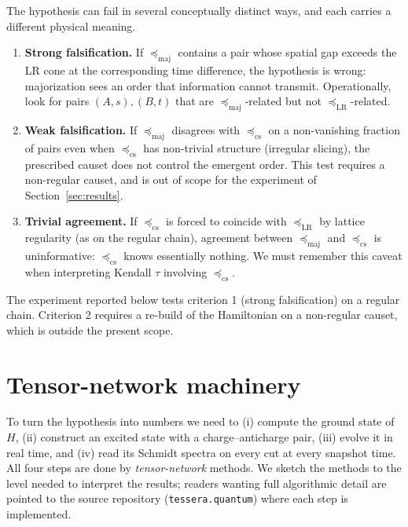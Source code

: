 \documentclass[11pt,a4paper]{article}
\theoremstyle{definition}
\theoremstyle{plain}
\theoremstyle{remark}
\newcommand{\maj}{\mathrm{maj}}
\newcommand{\LR}{\mathrm{LR}}
\newcommand{\cs}{\mathrm{cs}}
\begin{document}
The hypothesis can fail in several conceptually distinct ways, and
each carries a different physical meaning.

\begin{enumerate}[label=\arabic*.,leftmargin=*]
\item \textbf{Strong falsification.} If $\preceq_{\maj}$ contains a pair
      whose spatial gap exceeds the LR cone at the corresponding time
      difference, the hypothesis is wrong: majorization sees an order
      that information cannot transmit.  Operationally, look for pairs
      $(A, s), (B, t)$ that are $\preceq_{\maj}$-related but not
      $\preceq_{\LR}$-related.
\item \textbf{Weak falsification.} If $\preceq_{\maj}$ disagrees with
      $\preceq_{\cs}$ on a non-vanishing fraction of pairs even when
      $\preceq_{\cs}$ has non-trivial structure (irregular slicing),
      the prescribed causet does not control the emergent order.
      This test requires a non-regular causet, and is out of scope
      for the experiment of Section~\ref{sec:results}.
\item \textbf{Trivial agreement.} If $\preceq_{\cs}$ is forced to
      coincide with $\preceq_{\LR}$ by lattice regularity (as on the
      regular chain), agreement between $\preceq_{\maj}$ and
      $\preceq_{\cs}$ is uninformative: $\preceq_{\cs}$ knows
      essentially nothing.  We must remember this caveat when
      interpreting Kendall $\tau$ involving $\preceq_{\cs}$.
\end{enumerate}

The experiment reported below tests criterion 1 (strong falsification)
on a regular chain.  Criterion 2 requires a re-build of the
Hamiltonian on a non-regular causet, which is outside the present
scope.

\section{Tensor-network machinery}\label{sec:tn}

To turn the hypothesis into numbers we need to (i) compute the ground
state of $H$, (ii) construct an excited state with a charge--anticharge
pair, (iii) evolve it in real time, and (iv) read its Schmidt spectra
on every cut at every snapshot time.  All four steps are done by
\emph{tensor-network} methods.  We sketch the methods to the level
needed to interpret the results; readers wanting full algorithmic
detail are pointed to the source repository (\texttt{tessera.quantum})
where each step is implemented.
\end{document}

